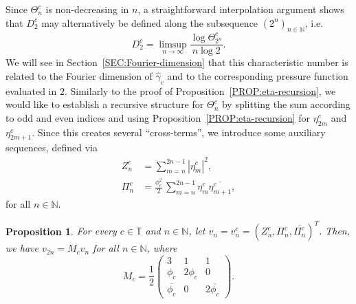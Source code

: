 \documentclass[11pt,reqno]{amsart}
\theoremstyle{plain}
\newtheorem{prop}[theorem]{Proposition}
\theoremstyle{definition}
\newcommand{\N}{{\mathbb N}}
\newcommand{\T}{{\mathbb T}}
\renewcommand{\c}{c}
\begin{document}
Since $\Theta_n^c$ is non-decreasing in $n$, a straightforward interpolation argument shows that $D_{2}^{c}$ may alternatively be defined along the subsequence $(2^n)_{n \in\N}$, i.e.\ 
$$D_2^c = \limsup_{n \to \infty} \frac{\log \Theta_{2^n}^{c} }{n \log 2}.$$
We will see in Section~\ref{SEC:Fourier-dimension} that this characteristic number is related to the Fourier dimension of $\widehat{\gamma}_{c}$ and  to  the corresponding pressure function evaluated in $2$. Similarly to the proof of Proposition~\ref{PROP:eta-recursion}, we would like to establish a recursive structure for $\Theta_n^{c}$ by splitting the sum according to odd and even indices and using  Proposition~\ref{PROP:eta-recursion}
for $\eta_{2m}^{c}$ and $\eta_{2m+1}^{c}$. Since this creates several ``cross-terms'', we introduce some auxiliary sequences, defined via
\begin{align*}
Z_n^c &= \sum_{m = n}^{2n-1} |\eta_m^c|^2,
\\ 
\Pi_n^c &= \frac{\phi_c^2}{2}\, \sum_{m=n}^{2n-1} \eta_{m}^{c} \overline{\eta_{m+1}^{c}},
\end{align*}
for all $n \in \N$. 

\begin{prop}
\label{PROP:v-M-recursion}
For every $\c\in \T$ and $n \in \N$, let $v_n =v_n^c = (Z_n^c, \Pi_n^c, \overline{\Pi^c_n})^{T}$. Then, we have $v_{2n} = M_c v_n$ for all $n \in \N$, where
\[
M_c = \frac{1}{2} \begin{pmatrix}
3 & 1 & 1 \\
\phi_{c} & 2 \phi_{c} & 0\\
\overline{\phi_{c}} & 0 & 2 \overline{\phi_{c}}
\end{pmatrix}.
\]
\end{prop}
\end{document}
